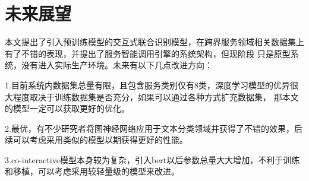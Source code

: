 \section{未来展望}
本文提出了引入预训练模型的交互式联合识别模型，在跨界服务领域相关数据集上有了不错的表现，并提出了服务智能调用引擎的系统架构，但现阶段
只是原型系统，没有进入实际生产环境。未来有以下几点改进方向：

1.目前系统内数据集总量有限，且包含服务类别仅有8类，深度学习模型的优异很大程度取决于训练数据集是否充分，如果可以通过各种方式扩充数据集，
那本文的模型一定可以获取更好的优化。

2.最优，有不少研究者将图神经网络应用于文本分类领域并获得了不错的效果，后续可以考虑采用类似的模型以期获得更好的性能。

3.co-interactive模型本身较为复杂，引入bert以后参数总量大大增加，不利于训练和移植，可以考虑采用较轻量级的模型来改进。

